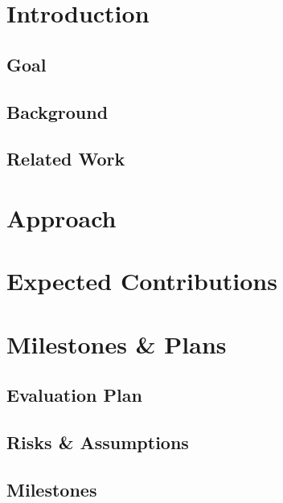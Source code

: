 \documentclass[10pt]{article}
\begin{document}
\maketitle

\section{Introduction}

\subsection{Goal}
\subsection{Background}
\cite{Liu:2012:CCI:2342356.2342431}
\subsection{Related Work}


\section{Approach}


\section{Expected Contributions}


\section{Milestones \& Plans}

\subsection{Evaluation Plan}


\subsection{Risks \& Assumptions}


\subsection{Milestones}




\end{document}
